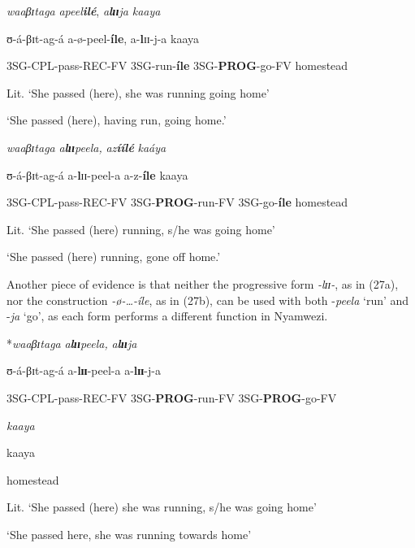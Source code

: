 \documentclass[output=paper,newtxmath,modfonts,nonflat,draftmode]{langsci/langscibook}
\begin{document}
\ea \label{ex:kanijo:26}
\ea

\textit{waaβɪ}\textit{taga}                   \textit{apeel}\textbf{\textit{ilé}},       \textit{a}\textbf{\textit{l}}\textbf{\textit{ɪɪ}}\textit{ja}                    \textit{kaaya} 

    ʊ-á-βɪt-ag-á                a-ø-peel-\textbf{íle}, a-\textbf{l}ɪɪ-j-a                 kaaya 

    3SG-CPL-pass-REC-FV 3SG-run-\textbf{íle}  3SG-\textbf{PROG}-go-FV homestead 


   Lit. ‘She passed (here), she was running going home’ 

   ‘She passed (here), having run, going home.’

\ex
\textit{waaβɪ}\textit{taga}                   \textit{a}\textbf{\textit{l}}\textbf{\textit{ɪɪ}}\textit{peela,}               \textit{az}\textbf{\textit{íílé}}         \textit{kaáya}

    ʊ-á-βɪt-ag-á                 a-\textbf{l}ɪɪ-peel-a            a-z-\textbf{íle}       kaaya

    3SG-CPL-pass-REC-FV 3SG-\textbf{PROG}-run-FV 3SG-go-\textbf{íle} homestead

    Lit. ‘She passed (here) running, s/he was going home’

    ‘She passed (here) running, gone off home.’
\z
\z

Another piece of evidence is that neither the progressive form \textit{-lɪɪ}\textit{-}, as in (27a), nor the construction \textit{-ø}\textit{-…-íle}, as in (27b), can be used with both -\textit{peela} ‘run’ and -\textit{ja} ‘go’, as each form performs a different function in Nyamwezi. 

\ea \label{ex:kanijo:27}
\ea
*\textit{waaβɪ}\textit{taga}                    \textit{a}\textbf{\textit{l}}\textbf{\textit{ɪɪ}}\textit{peela,}               \textit{a}\textbf{\textit{l}}\textbf{\textit{ɪɪ}}\textit{ja} 

      ʊ-á-βɪt-ag-á                 a-\textbf{lɪɪ}-peel-a             a-\textbf{lɪɪ}-j-a             

      3SG-CPL-pass-REC-FV 3SG-\textbf{PROG}-run-FV 3SG-\textbf{PROG}-go-FV

      \textit{kaaya}

      kaaya 

    homestead 

   Lit. ‘She passed (here) she was running, s/he was going home’

   ‘She passed here, she was running towards home’
\end{document}
